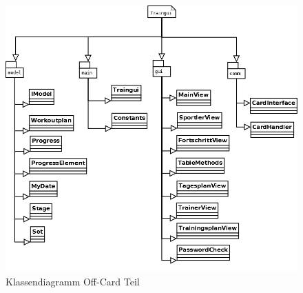 \begin{figure}[h]
\includegraphics[width=1\hsize]{./images/Diagramm1.png}
\caption{Klassendiagramm Off-Card Teil}
\label{off-card}
\end{figure}

